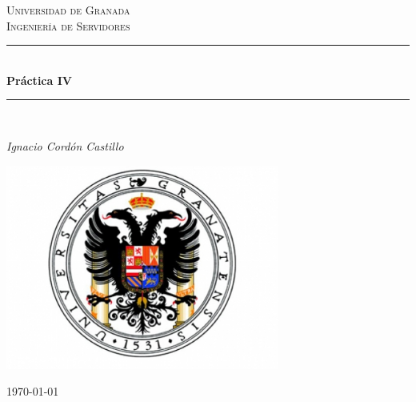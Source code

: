 \documentclass[a4paper,10pt]{article}
\begin{document}
\begin{titlepage}

\newcommand{\HRule}{\rule{\linewidth}{0.5mm}} %

\center %
 
\textsc{\LARGE Universidad de Granada}\\[1.5cm]
\textsc{\Large Ingeniería de Servidores}\\[0.5cm] 

\bigskip
\HRule \\[0.4cm]
{ \huge \bfseries Práctica IV}\\[0.4cm] %
\HRule \\[1.5cm]
 

\begin{minipage}{0.4\textwidth}
\begin{center} \large
\emph{Ignacio Cordón Castillo}\\
\end{center}
\end{minipage}


\begin{center}
\includegraphics[width=9cm]{../images/ugr.jpg}
\end{center}

\vspace{\fill}%
\large\today
\end{titlepage}  
\end{document}
